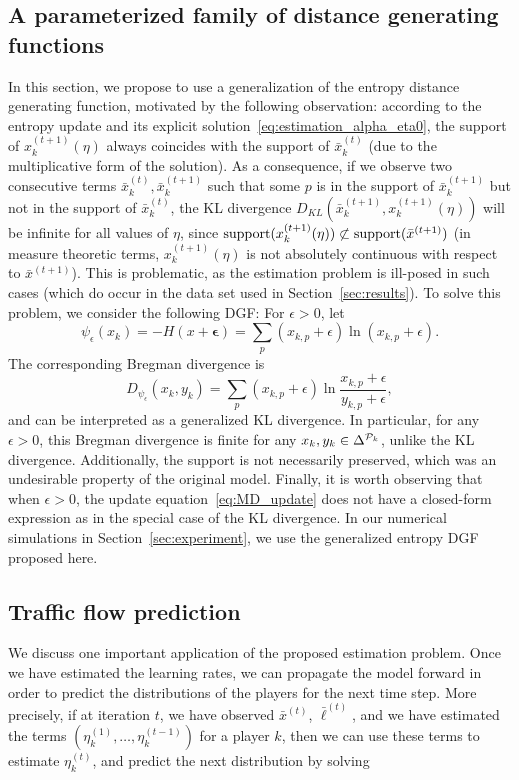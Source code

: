 \documentclass{sig-alternate-ipsn13}
\begin{document}
\subsection{A parameterized family of distance generating functions}
\label{subsec:reg_entropy}
In this section, we propose to use a generalization of the entropy distance generating function, motivated by the following observation:
according to the entropy update and its explicit solution~\eqref{eq:estimation_alpha_eta0}, the support of $x^{(t+1)}_k(\eta)$ always coincides with the support of $\bar x^{(t)}_k$ (due to the multiplicative form of the solution). As a consequence, if we observe two consecutive terms $\bar x^{(t)}_k, \bar x^{(t+1)}_k$ such that some $p$ is in the support of $\bar x^{(t+1)}_k$ but not in the support of $\bar x^{(t)}_k$, the KL divergence $D_{KL}(\bar x^{(t+1)}_k, x^{(t+1)}_k(\eta))$ will be infinite for all values of $\eta$, since $\operatorname*{support} (x^{(t+1)}_k(\eta)) \not\subset \operatorname*{support} (\bar x^{(t+1)})$ (in measure theoretic terms, $x^{(t+1)}_k(\eta)$ is not absolutely continuous with respect to $\bar x^{(t+1)}$). This is problematic, as the estimation problem is ill-posed in such cases (which do occur in the data set used in Section~\ref{sec:results}). To solve this problem, we consider the following DGF: For $\epsilon > 0$, let
\[
\psi_\epsilon(x_k) = -H(x+\mathbf \epsilon) = \sum_p (x_{k, p} + \epsilon) \ln (x_{k,p} + \epsilon).
\]
The corresponding Bregman divergence is
\[
D_{\psi_\epsilon}(x_k, y_k) = \sum_p (x_{k,p}+\epsilon)\ln\frac{x_{k, p} + \epsilon}{y_{k, p} + \epsilon},
\]
and can be interpreted as a generalized KL divergence. In particular, for any $\epsilon > 0$, this Bregman divergence is finite for any $x_k, y_k \in \Delta^{\mathcal{P}_k}$, unlike the KL divergence. Additionally, the support is not necessarily preserved, which was an undesirable property of the original model. Finally, it is worth observing that when $\epsilon > 0$, the update equation~\eqref{eq:MD_update} does not have a closed-form expression as in the special case of the KL divergence. In our numerical simulations in Section~\ref{sec:experiment}, we use the generalized entropy DGF proposed here.




\subsection{Traffic flow prediction}
We discuss one important application of the proposed estimation problem. Once we have estimated the learning rates, we can propagate the model forward in order to predict the distributions of the players for the next time step. More precisely, if at iteration $t$, we have observed $\bar x^{(t)}$, $\bar \ell^{(t)}$, and we have estimated the terms $(\eta_k^{(1)}, \dots, \eta_k^{(t-1)})$ for a player $k$, then we can use these terms to estimate $\eta_k^{(t)}$, and predict the next distribution by solving
\end{document}
